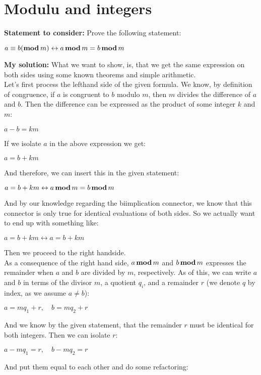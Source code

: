 \documentclass{report}
\newcommand{\cent}[1]{\begin{center}#1\end{center}}
\newcommand{\assignmentDescription}{\textbf{Statement to consider: }}
\newcommand{\solution}{\textbf{My solution: }}
\newcommand{\modInline}{\text{\textbf{mod\,}}}
\newcommand{\modFunc}{\text{\,\textbf{mod}\,}}
\begin{document}
 	\pagebreak
 	
 	\section{Modulu and integers}
 	\assignmentDescription Prove the following statement:
 	\cent{$a \equiv b (\modInline m) \leftrightarrow a \modFunc m = b \modFunc m$}
 	
 	\solution
 	What we want to show, is, that we get the same expression on both sides using some known theorems and simple arithmetic.\\
 	
 	Let's first process the lefthand side of the given formula. We know, by definition of congruence, if $a$ is congruent to $b$ modulo $m$, then $m$ divides the difference of $a$ and $b$. Then the difference can be expressed as the product of some integer $k$ and $m$:
 	
 	\cent{$a-b = km$}
 	
 	If we isolate $a$ in the above expression we get:
 	
 	\cent{$a = b + km$}
 	
 	And therefore, we can insert this in the given statement:
 	
 	\cent{$a = b + km \leftrightarrow a \modFunc m = b \modFunc m$}
 	
 	And by our knowledge regarding the biimplication connector, we know that this connector is only true for identical evaluations of both sides. So we actually want to end up with something like:
 	
 	\cent{$a = b + km \leftrightarrow a = b+km$}
 	
 	Then we proceed to the right handside.\\
 	
 	As a consequence of the right hand side, $a \modFunc m$ and $b \modFunc m$ expresses the remainder when $a$ and $b$ are divided by $m$, respectively. As of this, we can write $a$ and $b$ in terms of the divisor $m$, a quotient $q_i$, and a remainder $r$ (we denote $q$ by index, as we assume $a\neq b$):
 	
 	\cent{$a = m q_1 + r, \quad b = m q_2 + r$}
	
	And we know by the given statement, that the remainder $r$ must be identical for both integers. Then we can isolate $r$:
	
	\cent{$a - m q_1= r, \quad b - m q_2 = r$}
	
	And put them equal to each other and do some refactoring:
	
\end{document}
